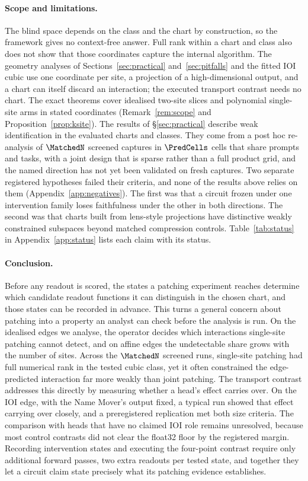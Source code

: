 \documentclass{article}
\theoremstyle{plain}
\theoremstyle{definition}
\begin{document}
\paragraph{Scope and limitations.} The blind space depends on the class and the chart by construction, so the framework gives no
context-free answer. Full rank within a chart and class also does not show that those coordinates capture the internal
algorithm. The geometry analyses of Sections~\ref{sec:practical} and~\ref{sec:pitfalls} and the fitted IOI
cubic use one coordinate per site, a projection of a high-dimensional output, and a chart can itself discard an
interaction; the executed transport contrast needs no chart. The exact theorems cover idealised two-site slices and polynomial single-site arms in stated coordinates
(Remark~\ref{rem:scope} and Proposition~\ref{prop:ksite}). The results of \S\ref{sec:practical} describe weak identification in
the evaluated charts and classes. They come from a post hoc re-analysis of $\MatchedN$ screened captures in
$\PredCells$ cells that share prompts and tasks, with a joint design that is sparse rather than a full product grid,
and the named direction has not yet been validated on fresh captures.
Two separate registered hypotheses failed their criteria, and none of the results above relies on them
(Appendix~\ref{app:negatives}). The first was that a circuit frozen under one intervention family loses faithfulness
under the other in both directions. The second was that charts built from lens-style projections have distinctive
weakly constrained subspaces beyond matched compression controls. Table~\ref{tab:status} in Appendix~\ref{app:status} lists each claim with its
status.

\paragraph{Conclusion.} Before any readout is scored, the states a patching experiment reaches determine which
candidate readout functions it can distinguish in the chosen chart, and those states can be recorded in advance. This
turns a general concern about patching into a property an analyst can check before the analysis is run. On the
idealised edges we analyse, the operator decides which interactions single-site patching cannot detect, and on affine
edges the undetectable share grows with the number of sites. Across the $\MatchedN$ screened runs, single-site patching
had full numerical rank in the tested cubic class, yet it often constrained the edge-predicted interaction far more
weakly than joint patching. The transport contrast addresses this directly by measuring whether a head's effect carries
over. On the IOI edge, with the Name Mover's output fixed, a typical run showed that effect carrying over closely, and a
preregistered replication met both size criteria. The comparison with heads that have no claimed IOI role remains
unresolved, because most control contrasts did not clear the float32 floor by the registered margin. Recording
intervention states and executing the four-point contrast require only additional forward passes, two extra readouts per tested state, and together they
let a circuit claim state precisely what its patching evidence establishes.

\FloatBarrier



\appendix

\end{document}

